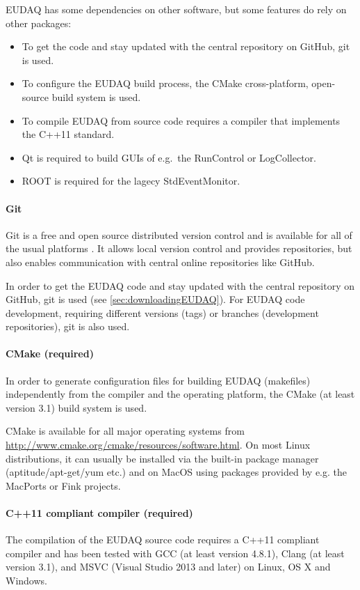 EUDAQ has some dependencies on other software, but some features do rely on other packages:
\begin{itemize}
\item To get the code and stay updated with the central repository on GitHub, git is used.
\item To configure the EUDAQ build process, the CMake cross-platform, open-source build system is used.
\item To compile EUDAQ from source code requires a compiler that implements the C++11 standard.
\item Qt is required to build GUIs of e.g.\ the RunControl or LogCollector. 
\item ROOT is required for the lagecy StdEventMonitor.
\end{itemize}

\paragraph{Git}
Git is a free and open source distributed version control and is available for all of the usual platforms \cite{gitWWW}. 
It allows local version control and provides repositories, but also enables communication with central online repositories like GitHub.
   
In order to get the EUDAQ code and stay updated with the central repository on GitHub, git is used (see \autoref{sec:downloadingEUDAQ}).
For EUDAQ code development, requiring different versions (tags) or branches (development repositories), git is also used. %


\paragraph{CMake (required)}
In order to generate configuration files for building EUDAQ (makefiles) independently from the compiler and the operating platform, the CMake (at least version 3.1) build system is used.

CMake is available for all major operating systems from \url{http://www.cmake.org/cmake/resources/software.html}. 
On most Linux distributions, it can usually be installed via the built-in package manager (aptitude/apt-get/yum etc.) and on MacOS using packages provided by e.g. the MacPorts or Fink projects.

\paragraph{C++11 compliant compiler (required)}
The compilation of the EUDAQ source code requires a C++11 compliant compiler and has been tested with GCC (at least version 4.8.1), Clang (at least version 3.1), and MSVC (Visual Studio 2013 and later) on Linux, OS X and Windows.

